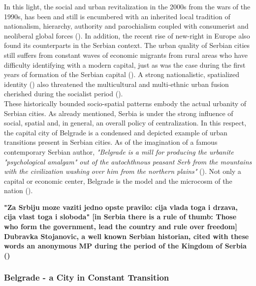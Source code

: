 \documentclass[11pt]{report}
\begin{document}
In this light, the social and urban revitalization in the 2000s from the wars of the 1990s, has been and still is encumbered with an inherited local tradition of nationalism, hierarchy, authority and parochialism coupled with consumerist and neoliberal global forces (\href{Stupar}{\citealt{stupar_aleksandra_recreating_2004}}).
In addition, the recent rise of new-right in Europe also found its counterparts in the Serbian context. The urban quality of Serbian cities still suffers from constant waves of economic migrants from rural areas who have difficulty identifying with a modern capital, just as was the case during the first years of formation of the Serbian capital (\href{ref}{\citealt{doytchinov_planning_2015}}).
A strong nationalistic, spatialized identity (\href{Savic}{\citealt{savic_where_2014}}) also threatened the multicultural and multi-ethnic urban fusion cherished during the socialist period (\href{Stupar}{\citealt{stupar_aleksandra_recreating_2004}}).
\\

These historically bounded socio-spatial patterns embody the actual urbanity of Serbian cities. As already mentioned, Serbia is under the strong influence of social, spatial and, in general, an overall policy of centralization. In this respect, the capital city of Belgrade is a condensed and depicted example of urban transitions present in Serbian cities. As of the imagination of a famous contemporary Serbian author,  \textit{"Belgrade is a mill for producing the urbanite "psychological amalgam" out of the autochthnous peasant Serb from the mountains with the civilization washing over him from the northern plains"} (\href{Velmar}{\citealt{jankovic_pogled_1992}}). Not only a capital or economic center, Belgrade is the model and the microcosm of the nation (\href{Zivkovic}{\citealt{zivkovic_serbian_2011}}).

\textbf{"Za Srbiju moze vaziti jedno opste pravilo: cija vlada toga i drzava, cija vlast toga i sloboda" [in Serbia there is a rule of thumb: Those who form the government, lead the country and rule over freedom] Dubravka Stojanovic, a well known Serbian historian, cited with these words an anonymous MP during the period of the Kingdom of Serbia (\href{Stojanovic}{\citealt{stojanovic_u_2010}})}

\subsubsection{Belgrade - a City in Constant Transition}
\end{document}
